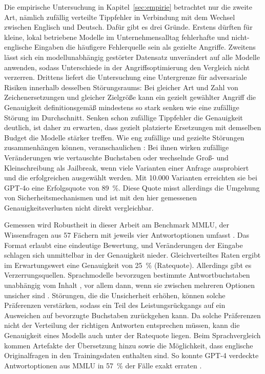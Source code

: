 \documentclass[a4paper,titlepage]{article}
\numberwithin{equation}{section} %
\begin{document}
Die empirische Untersuchung in Kapitel~\ref{sec:empirie} betrachtet nur die zweite Art, nämlich zufällig verteilte Tippfehler in Verbindung mit dem Wechsel zwischen Englisch und Deutsch. Dafür gibt es drei Gründe. Erstens dürften für kleine, lokal betriebene Modelle im Unternehmensalltag fehlerhafte und nicht-englische Eingaben die häufigere Fehlerquelle sein als gezielte Angriffe. Zweitens lässt sich ein modellunabhängig gestörter Datensatz unverändert auf alle Modelle anwenden, sodass Unterschiede in der Angriffsoptimierung den Vergleich nicht verzerren. Drittens liefert die Untersuchung eine Untergrenze für adversariale Risiken innerhalb desselben Störungsraums: Bei gleicher Art und Zahl von Zeichenersetzungen und gleicher Zielgröße kann ein gezielt gewählter Angriff die Genauigkeit definitionsgemäß mindestens so stark senken wie eine zufällige Störung im Durchschnitt. Senken schon zufällige Tippfehler die Genauigkeit deutlich, ist daher zu erwarten, dass gezielt platzierte Ersetzungen mit demselben Budget die Modelle stärker treffen. Wie eng zufällige und gezielte Störungen zusammenhängen können, veranschaulichen \citet{hughes_best--n_2024}: Bei ihnen wirken zufällige Veränderungen wie vertauschte Buchstaben oder wechselnde Groß- und Kleinschreibung als Jailbreak, wenn viele Varianten einer Anfrage ausprobiert und die erfolgreichen ausgewählt werden. Mit 10.000 Varianten erreichten sie bei GPT-4o eine Erfolgsquote von 89~\%. Diese Quote misst allerdings die Umgehung von Sicherheitsmechanismen und ist mit den hier gemessenen Genauigkeitsverlusten nicht direkt vergleichbar.

Gemessen wird Robustheit in dieser Arbeit am Benchmark MMLU, der Wissensfragen aus 57 Fächern mit jeweils vier Antwortoptionen umfasst \citep{hendrycks_measuring_2021}. Das Format erlaubt eine eindeutige Bewertung, und Veränderungen der Eingabe schlagen sich unmittelbar in der Genauigkeit nieder. Gleichverteiltes Raten ergibt im Erwartungswert eine Genauigkeit von 25~\% (Ratequote). Allerdings gibt es Verzerrungsquellen. Sprachmodelle bevorzugen bestimmte Antwortbuchstaben unabhängig vom Inhalt \citep{zheng_large_2024}, vor allem dann, wenn sie zwischen mehreren Optionen unsicher sind \citep{pezeshkpour_large_2023}. Störungen, die die Unsicherheit erhöhen, können solche Präferenzen verstärken, sodass ein Teil des Leistungsrückgangs auf ein Ausweichen auf bevorzugte Buchstaben zurückgehen kann. Da solche Präferenzen nicht der Verteilung der richtigen Antworten entsprechen müssen, kann die Genauigkeit eines Modells auch unter der Ratequote liegen. Beim Sprachvergleich kommen Artefakte der Übersetzung hinzu \citep{artetxe_translation_2020} sowie die Möglichkeit, dass englische Originalfragen in den Trainingsdaten enthalten sind. So konnte GPT-4 verdeckte Antwortoptionen aus MMLU in 57~\% der Fälle exakt erraten \citep{deng_investigating_2024}.
\end{document}
